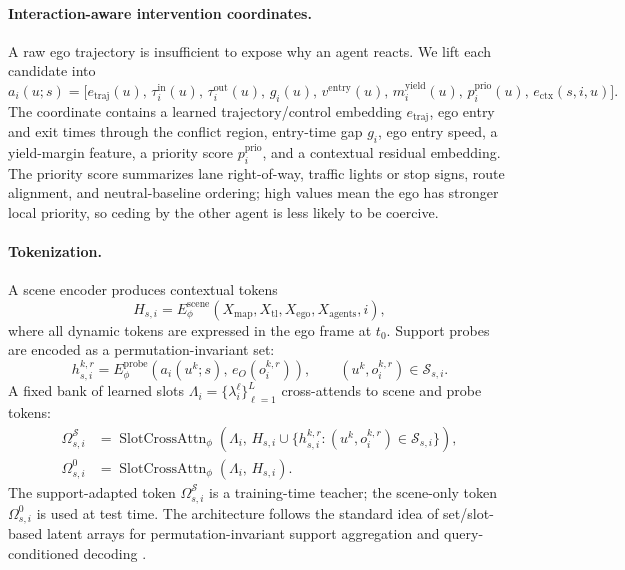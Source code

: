 \documentclass[10pt]{article}
\newcommand{\cS}{\mathcal{S}}
\begin{document}
\paragraph{Interaction-aware intervention coordinates.}
A raw ego trajectory is insufficient to expose why an agent reacts. We lift each candidate into
\begin{equation}
    a_i(u;s)
    =
    \Big[
    e_{\mathrm{traj}}(u),\,
    \tau_i^{\mathrm{in}}(u),\,
    \tau_i^{\mathrm{out}}(u),\,
    g_i(u),\,
    v^{\mathrm{entry}}(u),\,
    m_i^{\mathrm{yield}}(u),\,
    p_i^{\mathrm{prio}}(u),\,
    e_{\mathrm{ctx}}(s,i,u)
    \Big].
    \label{eq:intervention_coordinate}
\end{equation}
The coordinate contains a learned trajectory/control embedding \(e_{\mathrm{traj}}\), ego entry and exit times through the conflict region, entry-time gap \(g_i\), ego entry speed, a yield-margin feature, a priority score \(p_i^{\mathrm{prio}}\), and a contextual residual embedding. The priority score summarizes lane right-of-way, traffic lights or stop signs, route alignment, and neutral-baseline ordering; high values mean the ego has stronger local priority, so ceding by the other agent is less likely to be coercive.

\paragraph{Tokenization.}
A scene encoder produces contextual tokens
\begin{equation}
    H_{s,i}
    =
    E_\phi^{\mathrm{scene}}
    \left(
    X_{\mathrm{map}},
    X_{\mathrm{tl}},
    X_{\mathrm{ego}},
    X_{\mathrm{agents}},
    i
    \right),
    \label{eq:scene_tokens}
\end{equation}
where all dynamic tokens are expressed in the ego frame at \(t_0\). Support probes are encoded as a permutation-invariant set:
\begin{equation}
    h^{k,r}_{s,i}
    =
    E_\phi^{\mathrm{probe}}
    \left(
    a_i(u^k;s),\,
    e_O(o_i^{k,r})
    \right),
    \qquad
    (u^k,o_i^{k,r})\in\cS_{s,i}.
    \label{eq:probe_tokens}
\end{equation}
A fixed bank of learned slots \(\Lambda_i=\{\lambda_i^\ell\}_{\ell=1}^{L}\) cross-attends to scene and probe tokens:
\begin{align}
    \Omega_{s,i}^{\cS}
    &=
    \operatorname{SlotCrossAttn}_\phi
    \left(
    \Lambda_i,\,
    H_{s,i}\cup\{h^{k,r}_{s,i}:(u^k,o_i^{k,r})\in\cS_{s,i}\}
    \right),
    \label{eq:support_mechanism}\\
    \Omega_{s,i}^{0}
    &=
    \operatorname{SlotCrossAttn}_\phi
    \left(
    \Lambda_i,\,
    H_{s,i}
    \right).
    \label{eq:scene_only_mechanism}
\end{align}
The support-adapted token \(\Omega_{s,i}^{\cS}\) is a training-time teacher; the scene-only token \(\Omega_{s,i}^{0}\) is used at test time. The architecture follows the standard idea of set/slot-based latent arrays for permutation-invariant support aggregation and query-conditioned decoding \parencite{lee2019set,locatello2020object,jaegle2021perceiver}.
\end{document}
